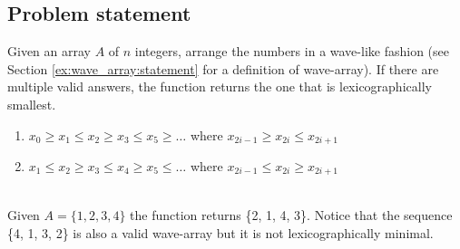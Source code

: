 \subsection{Problem statement}
\begin{exercise}
Given an array $A$ of $n$ integers, arrange the numbers in a wave-like fashion (see Section \ref{ex:wave_array:statement} for a definition of wave-array).
If there are multiple valid answers, the function returns the one that is lexicographically smallest.
	\begin{enumerate}
		\item  $x_0 \geq x_1 \leq x_2 \geq x_3 \leq  x_5 \geq \ldots$ where $x_{2i-1} \geq x_{2i} \leq x_{2i+1}$
		\item  $x_1 \leq x_2 \geq x_3 \leq x_4 \geq x_5 \leq \ldots$ where $x_{2i-1} \leq x_{2i} \geq x_{2i+1}$
	\end{enumerate}


	\begin{example}
		\hfill \\
		\label{ex:wave_array:var1:example1}
		Given $A=\{1, 2, 3, 4\}$ the function returns \{2, 1, 4, 3\}. Notice that the sequence \{4, 1, 3, 2\} is also a valid wave-array but it is not lexicographically minimal.
	\end{example}
\end{exercise}
